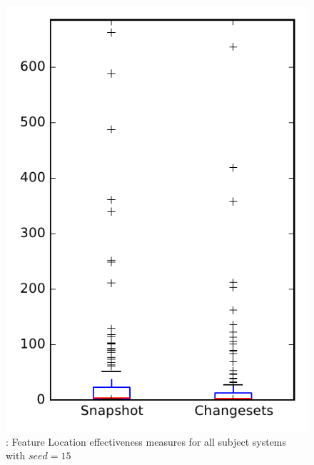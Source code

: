 
\begin{figure}
\centering
\includegraphics[height=0.4\textheight]{figures/flt_seed/rq1_overview_15}
\caption{\rone: Feature Location effectiveness measures for all subject systems with $seed=15$}
\label{fig:flt_seed:rq1:overview}
\end{figure}
